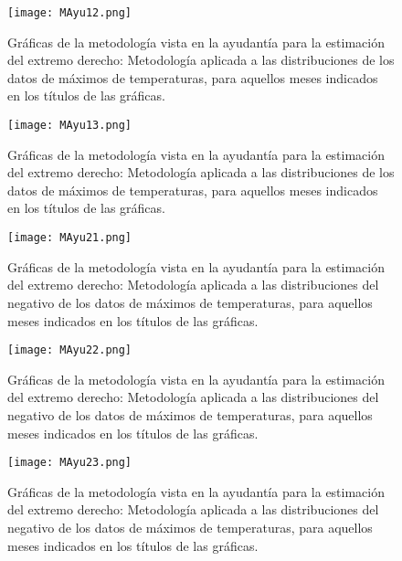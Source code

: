 \documentclass[10.5pt,notitlepage]{article}
\theoremstyle{plain}
\begin{document}
\begin{figure}[htb]
    \centering
    \texttt{[image: MAyu12.png]}
    \caption{Gráficas de la metodología vista en la ayudantía para la estimación del extremo derecho: Metodología aplicada a las distribuciones de los datos de máximos de temperaturas, para aquellos meses indicados en los títulos de las gráficas. }
    \label{fig:21}
\end{figure}

\begin{figure}[htb]
    \centering
    \texttt{[image: MAyu13.png]}
    \caption{Gráficas de la metodología vista en la ayudantía para la estimación del extremo derecho: Metodología aplicada a las distribuciones de los datos de máximos de temperaturas, para aquellos meses indicados en los títulos de las gráficas. }
    \label{fig:22}
\end{figure}

\begin{figure}[htb]
    \centering
    \texttt{[image: MAyu21.png]}
    \caption{Gráficas de la metodología vista en la ayudantía para la estimación del extremo derecho: Metodología aplicada a las distribuciones del negativo de los datos de máximos de temperaturas, para aquellos meses indicados en los títulos de las gráficas. }
    \label{fig:23}
\end{figure}

\begin{figure}[htb]
    \centering
    \texttt{[image: MAyu22.png]}
    \caption{Gráficas de la metodología vista en la ayudantía para la estimación del extremo derecho: Metodología aplicada a las distribuciones del negativo de los datos de máximos de temperaturas, para aquellos meses indicados en los títulos de las gráficas. }
    \label{fig:24}
\end{figure}

\begin{figure}[htb]
    \centering
    \texttt{[image: MAyu23.png]}
    \caption{Gráficas de la metodología vista en la ayudantía para la estimación del extremo derecho: Metodología aplicada a las distribuciones del negativo de los datos de máximos de temperaturas, para aquellos meses indicados en los títulos de las gráficas. }
    \label{fig:25}
\end{figure}





















\newpage
\end{document}
